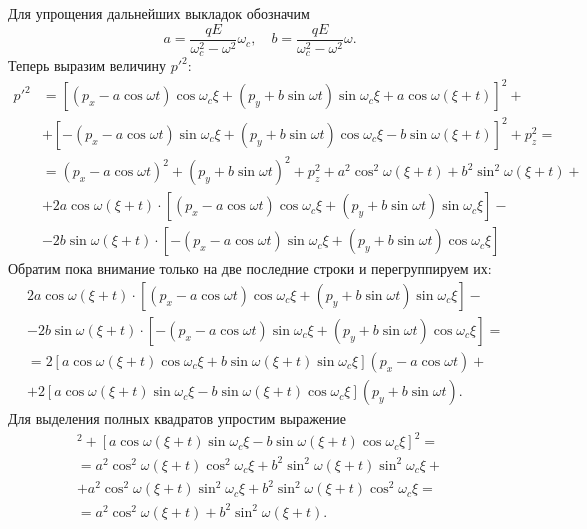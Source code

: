 Для упрощения дальнейших выкладок обозначим
\[
    a = \frac{qE}{\omega_c^2 - \omega^2}\omega_c,\quad
    b = \frac{qE}{\omega_c^2 - \omega^2}\omega.
\]
Теперь выразим величину \( {p'}^2 \):
\begin{align*}
    {p'}^2 & = \left[(p_x - a\cos\omega t)\cos\omega_c\xi +
               (p_y + b\sin\omega t)\sin\omega_c\xi +
               a\cos\omega(\xi+t)\right]^2 + \\
           & + \left[-(p_x - a\cos\omega t)\sin\omega_c\xi +
               (p_y + b\sin\omega t)\cos\omega_c\xi -
               b\sin\omega(\xi+t)\right]^2 + p_z^2 =\\
           & = (p_x - a\cos\omega t)^2 + (p_y + b\sin\omega t)^2 + p_z^2 +
                a^2\cos^2\omega(\xi+t) + b^2\sin^2\omega(\xi+t) +\\
           & + 2a\cos\omega(\xi+t)\cdot[(p_x - a\cos\omega t)\cos\omega_c\xi +
               (p_y + b\sin\omega t)\sin\omega_c\xi] -\\
           & - 2b\sin\omega(\xi+t)\cdot[-(p_x - a\cos\omega t)\sin\omega_c\xi +
               (p_y + b\sin\omega t)\cos\omega_c\xi]
\end{align*}
Обратим пока внимание только на две последние строки и перегруппируем их:
\begin{align*}
    & 2a\cos\omega(\xi+t)\cdot[(p_x - a\cos\omega t)\cos\omega_c\xi +
       (p_y + b\sin\omega t)\sin\omega_c\xi] -\\
    & - 2b\sin\omega(\xi+t)\cdot[-(p_x - a\cos\omega t)\sin\omega_c\xi +
       (p_y + b\sin\omega t)\cos\omega_c\xi] = \\
    & = 2[a\cos\omega(\xi+t)\cos\omega_c\xi + b\sin\omega(\xi+t)\sin\omega_c\xi]
       (p_x - a\cos\omega t) + \\
    & + 2[a\cos\omega(\xi+t)\sin\omega_c\xi - b\sin\omega(\xi+t)\cos\omega_c\xi]
       (p_y + b\sin\omega t).
\end{align*}
Для выделения полных квадратов упростим выражение
\begin{gather*}
    [a\cos\omega(\xi+t)\cos\omega_c\xi + b\sin\omega(\xi+t)\sin\omega_c\xi]^2 +
    [a\cos\omega(\xi+t)\sin\omega_c\xi - b\sin\omega(\xi+t)\cos\omega_c\xi]^2=\\
    =a^2\cos^2\omega(\xi+t)\cos^2\omega_c\xi +
    b^2\sin^2\omega(\xi+t)\sin^2\omega_c\xi + \\ +
    a^2\cos^2\omega(\xi+t)\sin^2\omega_c\xi +
    b^2\sin^2\omega(\xi+t)\cos^2\omega_c\xi =\\=
    a^2\cos^2\omega(\xi+t) + b^2\sin^2\omega(\xi+t).
\end{gather*}
